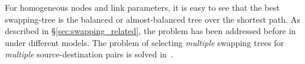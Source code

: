 For homogeneous nodes and link parameters, it is easy to see that the best swapping-tree is the balanced or almost-balanced tree over the shortest path.
As described in \S\ref{sec:swapping_related}, the \spp problem has been addressed before in~\cite{sigcomm20, caleffi} under different models. 
The problem of selecting \textit{multiple} swapping trees for \textit{multiple} source-destination pairs is solved in~\cite{swapping-tqe-22}.









